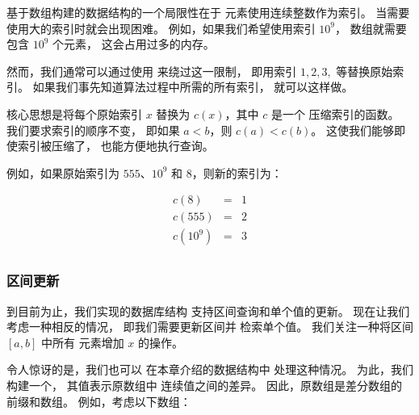 基于数组构建的数据结构的一个局限性在于
元素使用连续整数作为索引。
当需要使用大的索引时就会出现困难。
例如，如果我们希望使用索引 $10^9$，
数组就需要包含 $10^9$ 个元素，
这会占用过多的内存。


然而，我们通常可以通过使用
来绕过这一限制，
即用索引 $1,2,3,$ 等替换原始索引。
如果我们事先知道算法过程中所需的所有索引，
就可以这样做。

核心思想是将每个原始索引 $x$
替换为 $c(x)$，其中 $c$ 是一个
压缩索引的函数。
我们要求索引的顺序不变，
即如果 $a<b$，则 $c(a)<c(b)$。
这使我们能够即使索引被压缩了，
也能方便地执行查询。

例如，如果原始索引为
$555$、$10^9$ 和 $8$，则新的索引为：

\[
\begin{array}{lcl}
c(8) & = & 1 \\
c(555) & = & 2 \\
c(10^9) & = & 3 \\
\end{array}
\]

\subsubsection{区间更新}

到目前为止，我们实现的数据库结构
支持区间查询和单个值的更新。
现在让我们考虑一种相反的情况，
即我们需要更新区间并
检索单个值。
我们关注一种将区间 $[a,b]$ 中所有
元素增加 $x$ 的操作。


令人惊讶的是，我们也可以
在本章介绍的数据结构中
处理这种情况。
为此，我们构建一个，
其值表示原数组中
连续值之间的差异。
因此，原数组是差分数组的
前缀和数组。
例如，考虑以下数组：

\begin{center}
\end{center}

